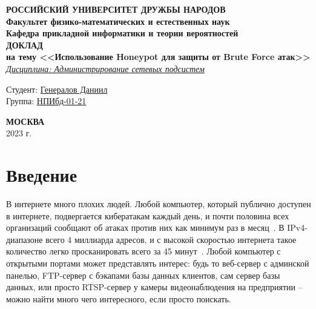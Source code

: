 \documentclass[a4page]{article}
\begin{document}
 
 
\begin{titlepage}

\begin{center}
\hfill \break
\textbf{
\large{РОССИЙСКИЙ УНИВЕРСИТЕТ ДРУЖБЫ НАРОДОВ}\\
\normalsize{Факультет физико-математических и естественных наук}\\ 
\normalsize{Кафедра прикладной информатики и теории вероятностей}\\
}
\vspace*{\fill}
\Large{\textbf{ДОКЛАД\\ на тему <<Использование Honeypot для защиты от Brute Force атак>>}}
\\
\underline{\textit{\normalsize{Дисциплина: Администрирование сетевых подсистем}}}
\vspace*{\fill}

\end{center}
 
 \begin{flushright}
 Студент: \underline{Генералов Даниил}\\ \vspace{0.5cm}
 Группа: \underline{НПИбд-01-21}
 \end{flushright}
 
 
\begin{center} \textbf{МОСКВА} \\ 2023 г. \end{center}
\thispagestyle{empty} %
 
\end{titlepage}

\newpage

\tableofcontents

\newpage

\newcommand{\code}[1]{\texttt{#1}}

\section{Введение}

В интернете много плохих людей. Любой компьютер, который публично доступен в интернете, подвергается кибератакам каждый день, и почти половина всех организаций сообщают об атаках против них как минимум раз в месяц~\cite{govuk:cyber}. В IPv4-диапазоне всего 4 миллиарда адресов, и с высокой скоростью интернета такое количество легко просканировать всего за 45 минут~\cite{scan-the-web}. Любой компьютер с открытыми портами может представлять интерес: будь то веб-сервер с админской панелью, FTP-сервер с бэкапами базы данных клиентов, сам сервер базы данных, или просто RTSP-сервер у камеры видеонаблюдения на предприятии – можно найти много чего интересного, если просто поискать.
\end{document}
